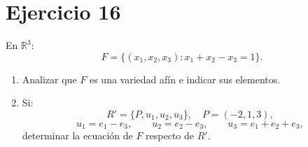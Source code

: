 \documentclass[11pt,a4paper]{article}
\newcommand{\R}{\mathbb{R}}
\begin{document}
\section{Ejercicio 16}
En $\R^3$:
\[
F=\{(x_1,x_2,x_3):x_1+x_2-x_3=1\}.
\]
\begin{enumerate}[label=\alph*)]
\item Analizar que $F$ es una variedad afín e indicar sus elementos.
\item Si:
\[
R'=\{P,u_1,u_2,u_3\},
\quad
P=(-2,1,3),
\]
\[
u_1=e_1-e_3,\qquad
u_2=e_2-e_3,\qquad
u_3=e_1+e_2+e_3,
\]
determinar la ecuación de $F$ respecto de $R'$.
\end{enumerate}
\end{document}
